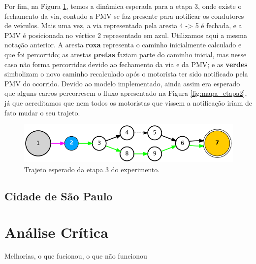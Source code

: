 Por fim, na Figura \ref{fig:mapa_etapa3}, temos a dinâmica esperada para a etapa 3, onde existe o fechamento da via, contudo a PMV se faz presente para notificar os condutores de veículos.
Mais uma vez, a via representada pela aresta 4 -> 5 é fechada, e a PMV é posicionada no vértice 2 representado em azul.
Utilizamos aqui a mesma notação anterior.
A aresta \textbf{roxa} representa o caminho inicialmente calculado e que foi percorrido;
as arestas \textbf{pretas} faziam parte do caminho inicial, mas nesse caso não forma percorridas devido ao fechamento da via e da PMV;
e as \textbf{verdes} simbolizam o novo caminho recalculado após o motorista ter sido notificado pela PMV do ocorrido.
Devido ao modelo implementado, ainda assim era esperado que alguns carros percorresem o fluxo apresentado na Figura \ref{fig:mapa_etapa2}, já que acreditamos que nem todos os motoristas que vissem
a notificação iriam de fato mudar o seu trajeto.

\begin{figure}[ht]
	\centering
	\includegraphics[width=\textwidth]{figuras/mapa_etapa3.png}
	\caption{Trajeto esperado da etapa 3 do experimento.}
	\label{fig:mapa_etapa3}
\end{figure}


\subsection{Cidade de São Paulo}

\section{Análise Crítica}

Melhorias, o que fucionou, o que não funcionou
